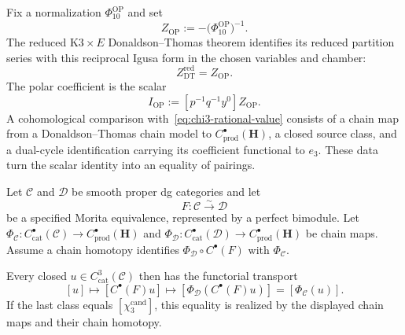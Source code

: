 \begin{remark}
\label{rem:chi3-dt-chain-comparison}
Fix a normalization \(\Phi_{10}^{\mathrm{OP}}\) and set
\begin{equation}
\label{eq:OP-DT-normalized-product}
 Z_{\mathrm{OP}}:=-\bigl(\Phi_{10}^{\mathrm{OP}}\bigr)^{-1}.
\end{equation}
The reduced \(\mathrm{K3}\times E\) Donaldson--Thomas theorem
\cite{OberdieckPixton2016} identifies
its reduced partition series with this reciprocal Igusa form in the
chosen variables and chamber:
\begin{equation}
\label{eq:oberdieck-reduced-dt}
 Z^{\mathrm{red}}_{\mathrm{DT}}=Z_{\mathrm{OP}}.
\end{equation}
The polar coefficient is the scalar
\begin{equation}
\label{eq:chi3-dt-pairing}
 I_{\mathrm{OP}}
 :=[p^{-1}q^{-1}y^0]Z_{\mathrm{OP}}.
\end{equation}
A cohomological comparison with~\eqref{eq:chi3-rational-value}
consists of a chain map from a Donaldson--Thomas chain model to
\(C^\bullet_{\mathrm{prod}}(\mathbf H)\), a closed source class, and a
dual-cycle identification carrying its coefficient functional to
\(e_3\).  These data turn the scalar identity into an equality of
pairings.
\end{remark}

\providecommand{\Kuz}{\mathrm{Ku}}

\begin{theorem}
\label{thm:hpd-obstruction-k3e-relative-replacement}
\ClaimStatusConditional
Let \(\mathcal C\) and \(\mathcal D\) be smooth proper dg categories and
let
\begin{equation}
\label{eq:hpd-fibration-pair}
\label{eq:hpd-fibration-equivalence}
 F:\mathcal C\xrightarrow{\sim}\mathcal D
\end{equation}
be a specified Morita equivalence, represented by a perfect bimodule.
Let
\(
 \Phi_{\mathcal C}:C^\bullet_{\mathrm{cat}}(\mathcal C)\to
 C^\bullet_{\mathrm{prod}}(\mathbf H)
\)
and
\(
 \Phi_{\mathcal D}:C^\bullet_{\mathrm{cat}}(\mathcal D)\to
 C^\bullet_{\mathrm{prod}}(\mathbf H)
\)
be chain maps.  Assume a chain homotopy identifies
\(\Phi_{\mathcal D}\circ C^\bullet(F)\) with
\(\Phi_{\mathcal C}\).

Every closed \(u\in C^3_{\mathrm{cat}}(\mathcal C)\) then has the
functorial transport
\begin{equation}
\label{eq:chi3-hpd-transport}
\label{eq:hpd-transport-of-chi3}
 [u]\longmapsto [C^\bullet(F)u]
 \longmapsto[\Phi_{\mathcal D}(C^\bullet(F)u)]
 =[\Phi_{\mathcal C}(u)].
\end{equation}
If the last class equals
\([\chi_3^{\mathrm{cand}}]\), this equality is realized by the displayed
chain maps and their chain homotopy.
\end{theorem}

